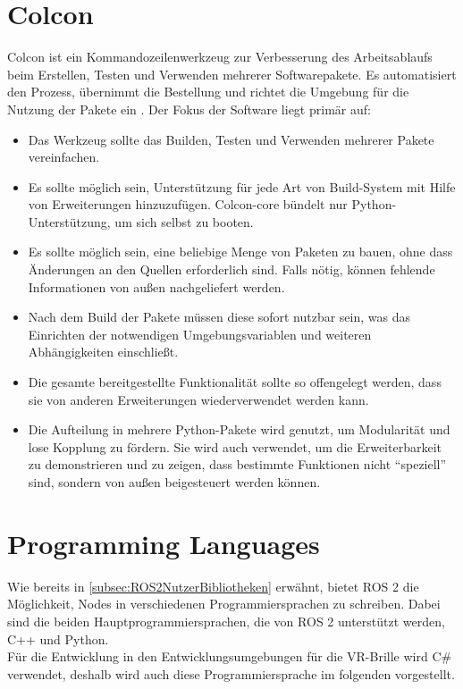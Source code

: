 \section{Colcon}\label{sec:Colcon}
Colcon ist ein Kommandozeilenwerkzeug zur Verbesserung des Arbeitsablaufs beim Erstellen, Testen und Verwenden mehrerer Softwarepakete. Es automatisiert den Prozess, übernimmt die Bestellung und richtet die Umgebung für die Nutzung der Pakete ein \cite{colcon_docs}. Der Fokus der Software liegt primär auf:\\
\begin{itemize}
    \item Das Werkzeug sollte das Builden, Testen und Verwenden mehrerer Pakete vereinfachen.
    \item Es sollte möglich sein, Unterstützung für jede Art von Build-System mit Hilfe von Erweiterungen hinzuzufügen. Colcon-core bündelt nur Python-Unterstützung, um sich selbst zu booten.
    \item Es sollte möglich sein, eine beliebige Menge von Paketen zu bauen, ohne dass Änderungen an den Quellen erforderlich sind. Falls nötig, können fehlende Informationen von außen nachgeliefert werden.
    \item Nach dem Build der Pakete müssen diese sofort nutzbar sein, was das Einrichten der notwendigen Umgebungsvariablen und weiteren Abhängigkeiten einschließt.
    \item Die gesamte bereitgestellte Funktionalität sollte so offengelegt werden, dass sie von anderen Erweiterungen wiederverwendet werden kann.
    \item Die Aufteilung in mehrere Python-Pakete wird genutzt, um Modularität und lose Kopplung zu fördern. Sie wird auch verwendet, um die Erweiterbarkeit zu demonstrieren und zu zeigen, dass bestimmte Funktionen nicht ``speziell'' sind, sondern von außen beigesteuert werden können.
\end{itemize}


\section{Programming Languages}
Wie bereits in \autoref{subsec:ROS2NutzerBibliotheken} erwähnt, bietet \ac{ROS} 2 die Möglichkeit, Nodes in verschiedenen Programmiersprachen zu schreiben. Dabei sind die beiden Hauptprogrammiersprachen, die von \ac{ROS} 2 unterstützt werden, C++ und Python. 
\\

\noindent
Für die Entwicklung in den Entwicklungsumgebungen für die VR-Brille wird C\# verwendet, deshalb wird auch diese Programmiersprache im folgenden vorgestellt.

